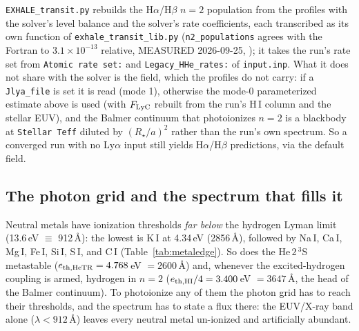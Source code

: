 \documentclass[english,a4paper]{my_memo}
\begin{document}
\noindent
\texttt{EXHALE\_transit.py} rebuilds the H$\alpha$/H$\beta$ $n{=}2$ population
from the profiles with the solver's level balance and the solver's rate
coefficients, each transcribed as its own function of
\texttt{exhale\_transit\_lib.py} (\texttt{n2\_populations} agrees with the
Fortran to $3.1\times10^{-13}$ relative, MEASURED 2026-09-25,
); it takes the run's rate set from
\texttt{Atomic rate set:} and \texttt{Legacy\_HHe\_rates:} of
\texttt{input.inp}. What it does not share with the solver is the field, which
the profiles do not carry: if a \texttt{Jlya\_file} is set it is read (mode 1),
otherwise the mode-0 parameterized estimate above is used (with $F_{\rm LyC}$
rebuilt from the run's H\,I column and the stellar EUV), and the Balmer
continuum that photoionizes $n{=}2$ is a blackbody at \texttt{Stellar Teff}
diluted by $(R_\star/a)^2$ rather than the run's own spectrum. So a converged
run with no Ly$\alpha$ input still yields H$\alpha$/H$\beta$ predictions, via
the default field.

\subsection{The photon grid and the spectrum that fills it}\label{sec:metalsed}
Neutral metals have ionization thresholds \emph{far below} the hydrogen Lyman
limit (13.6\,eV $\equiv$ 912\,\AA): the lowest is K\,I at 4.34\,eV (2856\,\AA),
followed by Na\,I, Ca\,I, Mg\,I, Fe\,I, Si\,I, S\,I, and C\,I
(Table~\ref{tab:metaledge}). So does the He\,$2\,^3$S metastable
($e_{\rm th,HeTR}=4.768$\,eV $=2600$\,\AA) and, whenever the excited-hydrogen
coupling is armed, hydrogen in $n=2$ ($e_{\rm th,HI}/4=3.400$\,eV
$=3647$\,\AA, the head of the Balmer continuum). To photoionize any of them the
photon grid has to reach their thresholds, and the spectrum has to state a
flux there: the EUV/X-ray band alone ($\lambda<912$\,\AA) leaves every
neutral metal un-ionized and artificially abundant.
\end{document}
